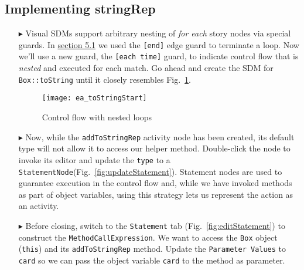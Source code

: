 \newpage
\hypertarget{stringRep vis}{}
\subsection{Implementing stringRep}
\visHeader

\begin{itemize}

\item[$\blacktriangleright$] Visual SDMs support arbitrary nesting of \emph{for each} story nodes via special guards. In \hyperlink{emptyPartition vis}{section
5.1} we used the \texttt{[end]} edge guard to terminate a loop. Now we'll use a new guard, the \texttt{[each time]} guard, to indicate control flow that is \emph{nested} and
executed for each match. Go ahead and create the SDM for \texttt{Box::toString} until it closely resembles Fig.~\ref{fig:sdm_tostring_1}. 

\vspace{0.5cm}

\begin{figure}[htbp]
\begin{center}
  \texttt{[image: ea\_toStringStart]}
  \caption{Control flow with nested loops} 
  \label{fig:sdm_tostring_1}
\end{center}
\end{figure}

\clearpage

\item[$\blacktriangleright$] Now, while the \texttt{addToStringRep} activity node has been created, its default type will not allow it to access our helper
method. Double-click the node to invoke its editor and update the \texttt{type} to a \texttt{StatementNode}(Fig.~\ref{fig:updateStatement}). Statement nodes are used to guarantee execution in the control flow and, while we have invoked methods as part of object
variables, using this strategy lets us represent the action as an activity.

\vspace{0.5cm}

\item[$\blacktriangleright$] Before closing, switch to the \texttt{Statement} tab (Fig.~\ref{fig:editStatement}) to construct the \texttt{MethodCallExpression}.
We want to access the \texttt{Box} object (\texttt{this}) and its \texttt{addToStringRep} method. Update the \texttt{Parameter Values} to \texttt{card} so we
can pass the object variable \texttt{card} to the method as parameter.

\vspace{0.5cm}

\begin{figure}[htbp]
   \centering
      \caption{}
\end{figure}
\FloatBarrier

\end{itemize}

